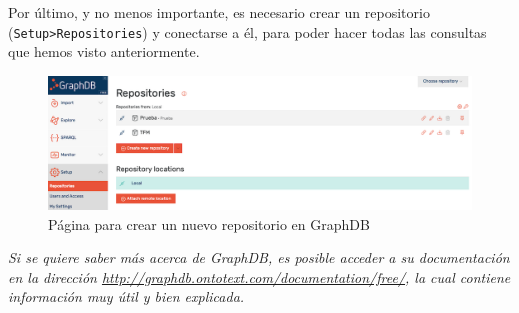 Por último, y no menos importante, es necesario crear un repositorio (\texttt{Setup>Repositories}) y conectarse a él, para poder hacer todas las consultas que hemos visto anteriormente.

\begin{figure}[H]
	\centering
	\includegraphics[width=1\linewidth]{imagenes/apendices/repo}
	\caption{Página para crear un nuevo repositorio en GraphDB}
	\label{fig:repo}
\end{figure}

\textit{Si se quiere saber más acerca de GraphDB, es posible acceder a su documentación en la dirección \url{http://graphdb.ontotext.com/documentation/free/}, la cual contiene información muy útil y bien explicada.}


